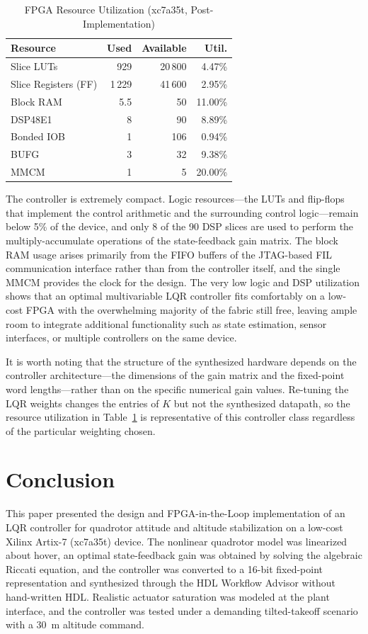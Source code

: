 \documentclass[conference]{IEEEtran}
\begin{document}
\begin{table}[!t]
\renewcommand{\arraystretch}{1.3}
\caption{FPGA Resource Utilization (xc7a35t, Post-Implementation)}
\label{tab:util}
\centering
\begin{tabular}{lrrr}
\toprule
\textbf{Resource} & \textbf{Used} & \textbf{Available} & \textbf{Util.}\\
\midrule
Slice LUTs & 929 & 20\,800 & 4.47\%\\
Slice Registers (FF) & 1\,229 & 41\,600 & 2.95\%\\
Block RAM & 5.5 & 50 & 11.00\%\\
DSP48E1 & 8 & 90 & 8.89\%\\
Bonded IOB & 1 & 106 & 0.94\%\\
BUFG & 3 & 32 & 9.38\%\\
MMCM & 1 & 5 & 20.00\%\\
\bottomrule
\end{tabular}
\end{table}

The controller is extremely compact. Logic resources---the LUTs and flip-flops that implement the control arithmetic and the surrounding control logic---remain below 5\% of the device, and only 8 of the 90 DSP slices are used to perform the multiply-accumulate operations of the state-feedback gain matrix. The block RAM usage arises primarily from the FIFO buffers of the JTAG-based FIL communication interface rather than from the controller itself, and the single MMCM provides the clock for the design. The very low logic and DSP utilization shows that an optimal multivariable LQR controller fits comfortably on a low-cost FPGA with the overwhelming majority of the fabric still free, leaving ample room to integrate additional functionality such as state estimation, sensor interfaces, or multiple controllers on the same device.

It is worth noting that the structure of the synthesized hardware depends on the controller architecture---the dimensions of the gain matrix and the fixed-point word lengths---rather than on the specific numerical gain values. Re-tuning the LQR weights changes the entries of $K$ but not the synthesized datapath, so the resource utilization in Table~\ref{tab:util} is representative of this controller class regardless of the particular weighting chosen.

\section{Conclusion}
This paper presented the design and FPGA-in-the-Loop implementation of an LQR controller for quadrotor attitude and altitude stabilization on a low-cost Xilinx Artix-7 (xc7a35t) device. The nonlinear quadrotor model was linearized about hover, an optimal state-feedback gain was obtained by solving the algebraic Riccati equation, and the controller was converted to a 16-bit fixed-point representation and synthesized through the HDL Workflow Advisor without hand-written HDL. Realistic actuator saturation was modeled at the plant interface, and the controller was tested under a demanding tilted-takeoff scenario with a 30~m altitude command.
\end{document}
